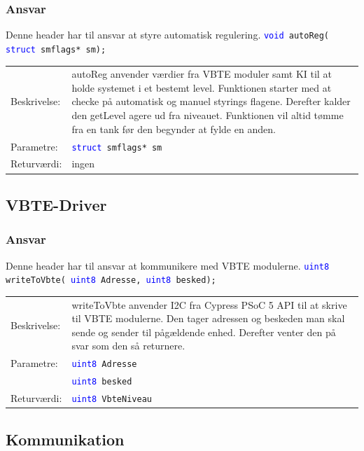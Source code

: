\subsubsection{Ansvar}
Denne header har til ansvar at styre automatisk regulering.
\texttt{\textcolor{blue}{void} autoReg( \textcolor{blue}{struct} smflags* sm);} 
\begin{table}[H]
\begin{tabular}{l p{12.5cm}}
\hline
Beskrivelse:& autoReg anvender værdier fra VBTE moduler samt KI til at holde systemet i et bestemt level. Funktionen starter med at checke på automatisk og manuel styrings flagene. Derefter kalder den getLevel agere ud fra niveauet. Funktionen vil altid tømme fra en tank før den begynder at fylde en anden.\\
Parametre:&\texttt{\textcolor{blue}{struct} smflags* sm}\\
Returværdi:&ingen\\
\end{tabular}
\end{table}
\subsection{VBTE-Driver}
\subsubsection{Ansvar}
Denne header har til ansvar at kommunikere med VBTE modulerne.
\texttt{\textcolor{blue}{uint8} writeToVbte( \textcolor{blue}{uint8} Adresse, \textcolor{blue}{uint8} besked);} 
\begin{table}[H]
\begin{tabular}{l p{12.5cm}}
\hline
Beskrivelse:& writeToVbte anvender I2C fra Cypress PSoC 5 API til at skrive til VBTE modulerne. Den tager adressen og beskeden man skal sende og sender til pågældende enhed. Derefter venter den på svar som den så returnere. \\
Parametre:&\texttt{\textcolor{blue}{uint8} Adresse}\\
 &\texttt{\textcolor{blue}{uint8} besked}\\
Returværdi:&\texttt{\textcolor{blue}{uint8} VbteNiveau}\\
\end{tabular}
\end{table}
\subsection{Kommunikation}
